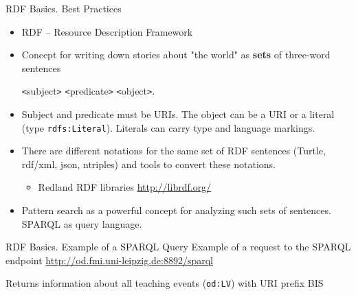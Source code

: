 \documentclass{beamer}
\def\lt{\texttt{<}}
\def\gt{\texttt{>}}
\begin{document}
\begin{frame}{RDF Basics. Best Practices}
  \begin{itemize}
  \item RDF -- Resource Description Framework
  \item Concept for writing down stories about "the world" as \textbf{sets} of
    three-word sentences
    \begin{center}
      {\lt}subject{\gt} {\lt}predicate{\gt} {\lt}object{\gt}.
    \end{center}
  \item Subject and predicate must be URIs. The object can be a URI or a
    literal (type \texttt{rdfs:Literal}). Literals can carry type and language
    markings.
  \item There are different notations for the same set of RDF sentences
    (Turtle, rdf/xml, json, ntriples) and tools to convert these notations.
    \begin{itemize}
    \item[] Redland RDF libraries \url{http://librdf.org/}
    \end{itemize}
  \item Pattern search as a powerful concept for analyzing such sets of
    sentences. SPARQL as query language.
  \end{itemize}
\end{frame}
\begin{frame}{RDF Basics. Example of a SPARQL Query}
Example of a request to the SPARQL endpoint
\url{http://od.fmi.uni-leipzig.de:8892/sparql}

Returns information about all teaching events (\texttt{od:LV}) with URI prefix
BIS
{\small\tt {}}
\end{frame}
\end{document}
